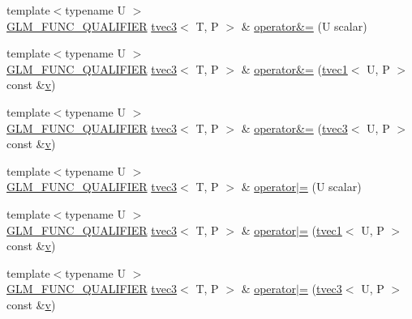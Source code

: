 \begin{DoxyCompactItemize}
\item 
{\footnotesize template$<$typename U $>$ }\\\mbox{\hyperlink{setup_8hpp_a33fdea6f91c5f834105f7415e2a64407}{G\+L\+M\+\_\+\+F\+U\+N\+C\+\_\+\+Q\+U\+A\+L\+I\+F\+I\+ER}} \mbox{\hyperlink{structglm_1_1tvec3}{tvec3}}$<$ T, P $>$ \& \mbox{\hyperlink{structglm_1_1tvec3_a86c329f940b7e44bf71452f5f13e21ba}{operator\&=}} (U scalar)
\item 
{\footnotesize template$<$typename U $>$ }\\\mbox{\hyperlink{setup_8hpp_a33fdea6f91c5f834105f7415e2a64407}{G\+L\+M\+\_\+\+F\+U\+N\+C\+\_\+\+Q\+U\+A\+L\+I\+F\+I\+ER}} \mbox{\hyperlink{structglm_1_1tvec3}{tvec3}}$<$ T, P $>$ \& \mbox{\hyperlink{structglm_1_1tvec3_a2553d75c1533a163ed6526f903e8a061}{operator\&=}} (\mbox{\hyperlink{structglm_1_1tvec1}{tvec1}}$<$ U, P $>$ const \&\mbox{\hyperlink{glad_8h_a14cfbe2fc2234f5504618905b69d1e06}{v}})
\item 
{\footnotesize template$<$typename U $>$ }\\\mbox{\hyperlink{setup_8hpp_a33fdea6f91c5f834105f7415e2a64407}{G\+L\+M\+\_\+\+F\+U\+N\+C\+\_\+\+Q\+U\+A\+L\+I\+F\+I\+ER}} \mbox{\hyperlink{structglm_1_1tvec3}{tvec3}}$<$ T, P $>$ \& \mbox{\hyperlink{structglm_1_1tvec3_a6ce7276861f4b1402c5dcf4324fac897}{operator\&=}} (\mbox{\hyperlink{structglm_1_1tvec3}{tvec3}}$<$ U, P $>$ const \&\mbox{\hyperlink{glad_8h_a14cfbe2fc2234f5504618905b69d1e06}{v}})
\item 
{\footnotesize template$<$typename U $>$ }\\\mbox{\hyperlink{setup_8hpp_a33fdea6f91c5f834105f7415e2a64407}{G\+L\+M\+\_\+\+F\+U\+N\+C\+\_\+\+Q\+U\+A\+L\+I\+F\+I\+ER}} \mbox{\hyperlink{structglm_1_1tvec3}{tvec3}}$<$ T, P $>$ \& \mbox{\hyperlink{structglm_1_1tvec3_a9360cf3807e8083c69a12ffc6151a981}{operator$\vert$=}} (U scalar)
\item 
{\footnotesize template$<$typename U $>$ }\\\mbox{\hyperlink{setup_8hpp_a33fdea6f91c5f834105f7415e2a64407}{G\+L\+M\+\_\+\+F\+U\+N\+C\+\_\+\+Q\+U\+A\+L\+I\+F\+I\+ER}} \mbox{\hyperlink{structglm_1_1tvec3}{tvec3}}$<$ T, P $>$ \& \mbox{\hyperlink{structglm_1_1tvec3_a36f603bc6496f2bc32b3e3001ba38e57}{operator$\vert$=}} (\mbox{\hyperlink{structglm_1_1tvec1}{tvec1}}$<$ U, P $>$ const \&\mbox{\hyperlink{glad_8h_a14cfbe2fc2234f5504618905b69d1e06}{v}})
\item 
{\footnotesize template$<$typename U $>$ }\\\mbox{\hyperlink{setup_8hpp_a33fdea6f91c5f834105f7415e2a64407}{G\+L\+M\+\_\+\+F\+U\+N\+C\+\_\+\+Q\+U\+A\+L\+I\+F\+I\+ER}} \mbox{\hyperlink{structglm_1_1tvec3}{tvec3}}$<$ T, P $>$ \& \mbox{\hyperlink{structglm_1_1tvec3_ad176614ebae121c5efbb4a28c29080ef}{operator$\vert$=}} (\mbox{\hyperlink{structglm_1_1tvec3}{tvec3}}$<$ U, P $>$ const \&\mbox{\hyperlink{glad_8h_a14cfbe2fc2234f5504618905b69d1e06}{v}})

\end{DoxyCompactItemize}

